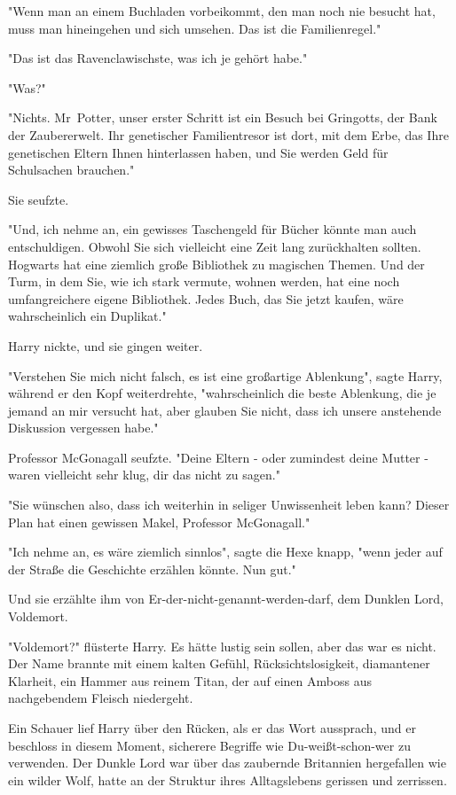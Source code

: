 {"Wenn man an einem Buchladen vorbeikommt, den man noch nie besucht hat, muss man hineingehen und sich umsehen. Das ist die Familienregel."

"Das ist das Ravenclawischste, was ich je gehört habe."

"Was?"

"Nichts. Mr~Potter, unser erster Schritt ist ein Besuch bei Gringotts, der Bank der Zaubererwelt. Ihr genetischer Familientresor ist dort, mit dem Erbe, das Ihre genetischen Eltern Ihnen hinterlassen haben, und Sie werden Geld für Schulsachen brauchen."

Sie seufzte.

"Und, ich nehme an, ein gewisses Taschengeld für Bücher könnte man auch entschuldigen. Obwohl Sie sich vielleicht eine Zeit lang zurückhalten sollten. Hogwarts hat eine ziemlich große Bibliothek zu magischen Themen. Und der Turm, in dem Sie, wie ich stark vermute, wohnen werden, hat eine noch umfangreichere eigene Bibliothek. Jedes Buch, das Sie jetzt kaufen, wäre wahrscheinlich ein Duplikat."

Harry nickte, und sie gingen weiter.

"Verstehen Sie mich nicht falsch, es ist eine großartige Ablenkung", sagte Harry, während er den Kopf weiterdrehte, "wahrscheinlich die beste Ablenkung, die je jemand an mir versucht hat, aber glauben Sie nicht, dass ich unsere anstehende Diskussion vergessen habe."

Professor McGonagall seufzte. "Deine Eltern - oder zumindest deine Mutter - waren vielleicht sehr klug, dir das nicht zu sagen."

"Sie wünschen also, dass ich weiterhin in seliger Unwissenheit leben kann? Dieser Plan hat einen gewissen Makel, Professor McGonagall."

"Ich nehme an, es wäre ziemlich sinnlos", sagte die Hexe knapp, "wenn jeder auf der Straße die Geschichte erzählen könnte. Nun gut."

Und sie erzählte ihm von Er-der-nicht-genannt-werden-darf, dem Dunklen Lord, Voldemort.

"Voldemort?" flüsterte Harry. Es hätte lustig sein sollen, aber das war es nicht. Der Name brannte mit einem kalten Gefühl, Rücksichtslosigkeit, diamantener Klarheit, ein Hammer aus reinem Titan, der auf einen Amboss aus nachgebendem Fleisch niedergeht.

Ein Schauer lief Harry über den Rücken, als er das Wort aussprach, und er beschloss in diesem Moment, sicherere Begriffe wie Du-weißt-schon-wer zu verwenden. Der Dunkle Lord war über das zaubernde Britannien hergefallen wie ein wilder Wolf, hatte an der Struktur ihres Alltagslebens gerissen und zerrissen.

}
